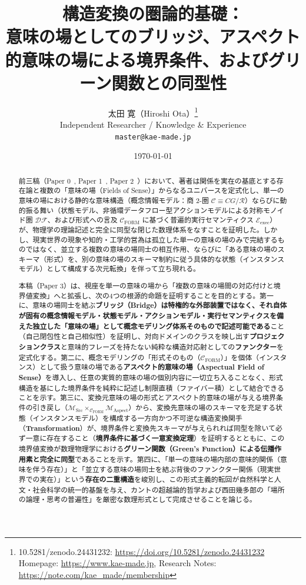 \documentclass[11pt,a4paper]{ltjsarticle}
\title{\textbf{構造変換の圏論的基礎：\\
意味の場としてのブリッジ、アスペクト的意味の場による境界条件、およびグリーン関数との同型性}}
\author{太田 寛（Hiroshi Ota）\thanks{10.5281/zenodo.24431232: \url{https://doi.org/10.5281/zenodo.24431232} \\ Homepage: \url{https://www.kae-made.jp}, Research Notes: \url{https://note.com/kae_made/membership}} \\
\small Independent Researcher / Knowledge \& Experience\\
\small \texttt{master@kae-made.jp}}
\date{\today}
\theoremstyle{definition}
\theoremstyle{plain}
\theoremstyle{remark}
\newcommand{\CFORM}{\mathcal{C}_{\mathrm{FORM}}}
\newcommand{\MSrc}{\mathcal{M}_{\mathrm{Src}}}
\newcommand{\MAspect}{\mathcal{M}_{\mathrm{Aspect}}}
\newcommand{\Eexec}{\mathcal{E}_{\mathrm{exec}}}
\begin{document}
\maketitle

\begin{abstract}
前三稿（Paper 0~\cite{ota2026paper0}, Paper 1~\cite{ota2026paper1}, Paper 2~\cite{ota2026paper2}）において、著者は関係を実在の基底とする存在論と複数の「意味の場（Fields of Sense）」からなるユニバースを定式化し、単一の意味の場における静的な意味構造（概念情報モデル：商 2-圏 $\mathcal{C} \equiv CG/\mathcal{R}$）ならびに動的振る舞い（状態モデル、非循環データフロー型アクションモデルによる対称モノイド圏 $\mathcal{DF}$、および形式への言及 $\CFORM$ に基づく普遍的実行セマンティクス $\Eexec$）が、物理学の理論記述と完全に同型な閉じた数理体系をなすことを証明した。しかし、現実世界の現象や知的・工学的営為は孤立した単一の意味の場のみで完結するものではなく、並立する複数の意味の場同士の相互作用、ならびに「ある意味の場のスキーマ（形式）を、別の意味の場のスキーマ制約に従う具体的な状態（インスタンスモデル）として構成する次元転換」を伴って立ち現れる。

本稿（Paper 3）は、視座を単一の意味の場から「複数の意味の場間の対応付けと境界値変換」へと拡張し、次の4つの根源的命題を証明することを目的とする。第一に、意味の場同士を結ぶ\textbf{ブリッジ（Bridge）は特権的な外部装置ではなく、それ自体が固有の概念情報モデル・状態モデル・アクションモデル・実行セマンティクスを備えた独立した「意味の場」として概念モデリング体系そのもので記述可能である}こと（自己閉包性と自己相似性）を証明し、対向ドメインのクラスを映し出す\textbf{プロジェクションクラス}と意味的フレーズを持たない純粋な構造対応射としての\textbf{ファンクター}を定式化する。第二に、概念モデリングの「形式そのもの（$\CFORM$）」を個体（インスタンス）として扱う意味の場である\textbf{アスペクト的意味の場（Aspectual Field of Sense）}を導入し、任意の実質的意味の場の個別内容に一切立ち入ることなく、形式構造を基にした境界条件を純粋に記述し制限直積（ファイバー積）として結合できることを示す。第三に、変換元意味の場の形式とアスペクト的意味の場が与える境界条件の引き戻し（$\MSrc \times_{\CFORM} \MAspect$）から、変換先意味の場のスキーマを充足する状態（インスタンスモデル）を構成する一方向かつ不可逆な構造変換関手（\textbf{Transformation}）が、境界条件と変換先スキーマが与えられれば同型を除いて必ず一意に存在すること（\textbf{境界条件に基づく一意変換定理}）を証明するとともに、この境界値変換が数理物理学における\textbf{グリーン関数（Green's Function）による伝播作用素と完全に同型}であることを示す。第四に、「単一の意味の場内部の意味的関係（意味を伴う存在）」と「並立する意味の場同士を結ぶ背後のファンクター関係（現実世界での実在）」という\textbf{存在の二重構造}を峻別し、この形式主義的転回が自然科学と人文・社会科学の統一的基盤を与え、カントの超越論的哲学および西田幾多郎の「場所の論理・思考の普遍性」を厳密な数理形式として完成させることを論じる。
\end{abstract}
\end{document}
